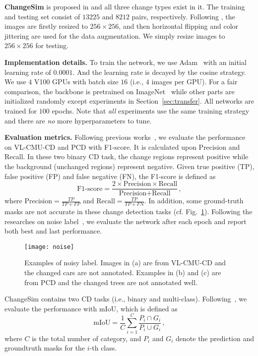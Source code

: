 \documentclass[review]{elsarticle}
\begin{document}
\textbf{ChangeSim} is proposed in \cite{changesim} and all three change types exist in it. The training and testing set consist of $13225$ and $8212$ pairs, respectively. Following \cite{changesim}, the images are firstly resized to $256\times 256$, and then horizontal flipping and color jittering are used for the data augmentation. We simply resize images to $256\times 256$ for testing.

\textbf{Implementation details.} To train the network, we use Adam~\cite{Adam} with an initial learning rate of $0.0001$. And the learning rate is decayed by the cosine strategy. We use $4$ V100 GPUs with batch size $16$ (i.e., $4$ images per GPU). For a fair comparison, the backbone is pretrained on ImageNet~\cite{imagenet} while other parts are initialized randomly except experiments in Section~\ref{sec:transfer}. All networks are trained for $100$ epochs. Note that \emph{all} experiments use the same training strategy and there are \emph{no} more hyperparameters to tune.

\textbf{Evaluation metrics.} Following previous works~\cite{DR_TANet,HPCFNet}, we evaluate the performance on VL-CMU-CD and PCD with F1-score. It is calculated upon Precision and Recall. In these two binary CD task, the change regions represent positive while the background (unchanged regions) represent negative. Given true positive (TP), false positive (FP) and false negative (FN), the F1-score is defined as
\begin{equation}
  \text{F1-score}=\frac{2\times \text{Precision} \times \text{Recall}}{\text{Precision} + \text{Recall}}\,,
\end{equation}
where $\text{Precision}=\frac{TP}{TP+FP}$ and $\text{Recall}=\frac{TP}{TP+FN}$. In addition, some ground-truth masks are not accurate in these change detection tasks (cf. Fig.~\ref{fig:noise}). Following the researches on noise label~\cite{PENCIL,dividemix}, we evaluate the network after each epoch and report both best and last performance. 

\begin{figure}
	\centering
	\texttt{[image: noise]}
	\caption{Examples of noisy label. Images in (a) are from VL-CMU-CD and the changed cars are not annotated. Examples in (b) and (c) are from PCD and the changed trees are not annotated well.}
	\label{fig:noise}
\end{figure}

ChangeSim contains two CD tasks (i.e., binary and multi-class). Following~\cite{changesim}, we evaluate the performance with mIoU, which is defined as 
\begin{equation}
  \text{mIoU}=\frac{1}{C}\sum^C_{i=1}\frac{P_i\cap G_i}{P_i\cup G_i}\,,
\end{equation}
where $C$ is the total number of category, and $P_i$ and $G_i$ denote the prediction and groundtruth masks for the $i$-th class.
\end{document}
